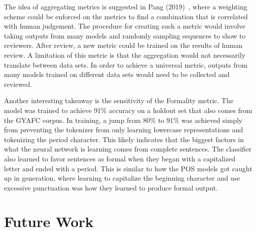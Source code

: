 \documentclass[12pt]{article}
\begin{document}
The idea of aggregating metrics is suggested in Pang (2019)~\cite{pang2019daunting}, where a weighting
scheme could be enforced on the metrics to find a combination that is correlated with human judgement. 
The procedure for creating such a metric would involve taking outputs from many models and randomly sampling 
sequences to show to reviewers. After review, a new metric could be trained on the results of human 
review. A limitation of this metric is that the aggregation would not necessarily 
translate between data sets. In order to achieve a universal metric, outputs from many models trained on 
different data sets would need to be collected and reviewed. 

\par
Another interesting takeaway is the sensitivity of the Formality metric. The model was trained to 
achieve 91\% accuracy on a holdout set that also comes from the GYAFC corpus. 
In training, a jump from 80\% to 91\% was achieved simply from preventing the tokenizer from 
only learning lowercase representations and tokenizing the period character. 
This likely indicates that the biggest factors in what the neural network is learning comes from 
complete sentences. The classifier also learned to 
favor sentences as formal when they began with a capitalized letter and ended with a period. This is
similar to how the POS models got caught up in generation, where learning to capitalize the beginning
character and use excessive punctuation was how they learned to produce formal output.


\section{Future Work}
\end{document}
